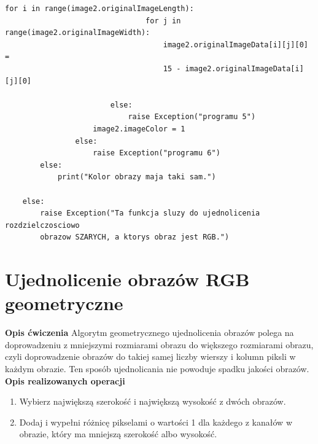 \documentclass[magisterska,openany]{pracadypl}
\begin{document}
\begin{lstlisting}[caption={Rozdzielczościowe ujednolicanie obrazów szarych}]
                            for i in range(image2.originalImageLength):
                                for j in range(image2.originalImageWidth):
                                    image2.originalImageData[i][j][0] = 
                                    15 - image2.originalImageData[i][j][0]

                        else:
                            raise Exception("programu 5")
                    image2.imageColor = 1
                else:
                    raise Exception("programu 6")
        else:
            print("Kolor obrazy maja taki sam.")

    else:
        raise Exception("Ta funkcja sluzy do ujednolicenia rozdzielczosciowo
        obrazow SZARYCH, a ktorys obraz jest RGB.")

\end{lstlisting}
\newpage

\section{Ujednolicenie obrazów RGB geometryczne}

\vspace{0.5cm}\textbf{\Large Opis ćwiczenia}
\vspace{0.25cm}\newline
Algorytm geometrycznego ujednolicenia obrazów polega na doprowadzeniu z mniejszymi rozmiarami obrazu do większego rozmiarami obrazu, czyli doprowadzenie obrazów do takiej samej liczby wierszy i kolumn piksli w każdym obrazie.
Ten sposób ujednolicania nie powoduje spadku jakości obrazów.
\newline
\newline
\textbf{\Large Opis realizowanych operacji}
\begin{enumerate}
\item Wybierz największą szerokość i największą wysokość z dwóch obrazów.
\item Dodaj i wypełni różnicę pikselami o wartości 1 dla każdego z kanałów w obrazie, który ma mniejszą szerokość albo wysokość.
\end{enumerate}
\end{document}
